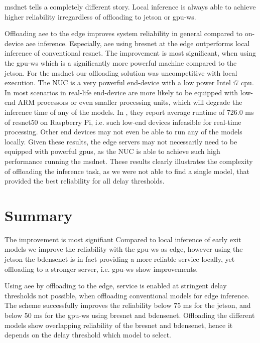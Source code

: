 \gls{msdnet} tells a completely different story. Local inference is always able to achieve higher reliability irregardless of offloading to \gls{jetson} or \gls{gpu-ws}. 

Offloading \gls{aee} to the edge improves system reliability in general compared to on-device \gls{aee} inference. Especially, \gls{aee} using \gls{bresnet} at the edge outperforms local inference of conventional \gls{resnet}. The improvement is most significant, when using the \gls{gpu-ws} which is a significantly more powerful machine compared to the \gls{jetson}. For the \gls{msdnet} our offloading solution was uncompetitive with local execution. The NUC is a very powerful end-device with a low power Intel i7 \gls{cpu}. In most scenarios in real-life end-device are more likely to be equipped with low-end ARM processors or even smaller processing units, which will degrade the inference time of any of the models. In \cite{zheng_apache/incubator-tvm_nodate}, they report average runtime of 726.0 ms of \gls{resnet}50 on Raspberry Pi, i.e. such low-end devices infeasible for real-time processing. Other end devices may not even be able to run any of the models locally. Given these results, the edge servers may not necessarily need to be equipped with powerful \gls{gpu}s, as the NUC is able to achieve such high performance running the \gls{msdnet}. These results clearly illustrates the complexity of offloading the inference task, as we were not able to find a single model, that provided the best reliability for all delay thresholds.

\section{Summary} \label{sec:edge-summary}


The improvement is most signifiant  Compared to local inference of early exit models we improve the reliability with the \gls{gpu-ws} as edge, however using the \gls{jetson} the \gls{bdensenet} is in fact providing a more reliable service locally, yet offloading to a stronger server, i.e. \gls{gpu-ws} show improvements.

Using \gls{aee} by offloading to the edge, service is enabled at stringent delay thresholds not possible, when offloading conventional models for edge inference. The scheme successfully improves the reliability below 75 ms for the \gls{jetson}, and below 50 ms for the \gls{gpu-ws} using \gls{bresnet} and \gls{bdensenet}. Offloading the different models show overlapping reliability of the \gls{bresnet} and \gls{bdensenet}, hence it depends on the delay threshold which model to select. 


